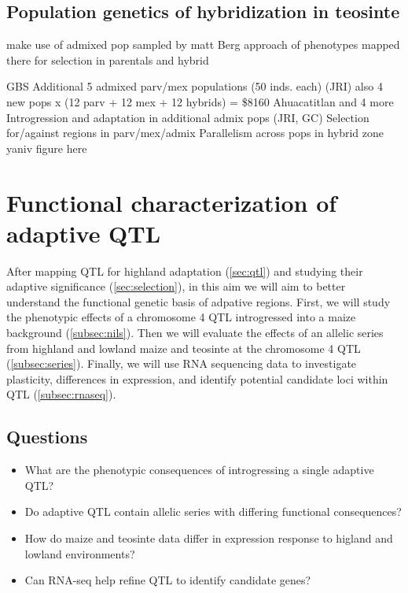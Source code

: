 
\subsection{Population genetics of hybridization in teosinte} \label{subsec:admixpopgen}


make use of admixed pop sampled by matt
Berg approach of phenotypes mapped there for selection in parentals and hybrid

GBS Additional 5 admixed parv/mex populations (50 inds. each) (JRI)
also 4 new pops x (12 parv + 12 mex + 12 hybrids) = \$8160
Ahuacatitlan and 4 more
Introgression and adaptation in additional admix pops (JRI, GC)
Selection for/against regions in parv/mex/admix
Parallelism across pops in hybrid zone
yaniv figure here

\section{Functional characterization of adaptive QTL} \label{sec:funchar}

After mapping QTL for highland adaptation (\ref{sec:qtl}) and studying their adaptive significance (\ref{sec:selection}), in this aim we will aim to better understand the functional genetic basis of adpative regions.  First, we will study the phenotypic effects of a chromosome 4 QTL introgressed into a maize background (\ref{subsec:nils}).  Then we will evaluate the effects of an allelic series from highland and lowland maize and teosinte at the chromosome 4 QTL (\ref{subsec:series}).  Finally, we will use RNA sequencing data to investigate plasticity, differences in expression, and identify potential candidate loci within QTL (\ref{subsec:rnaseq}).

\subsection{Questions}
\begin{itemize}[topsep=0pt,itemsep=-1ex,partopsep=1ex,parsep=1ex]
\item What are the phenotypic consequences of introgressing a single adaptive QTL?
\item Do adaptive QTL contain allelic series with differing functional consequences?
\item How do maize and teosinte data differ in expression response to higland and lowland environments?
\item Can RNA-seq help refine QTL to identify candidate genes?
\end{itemize}

